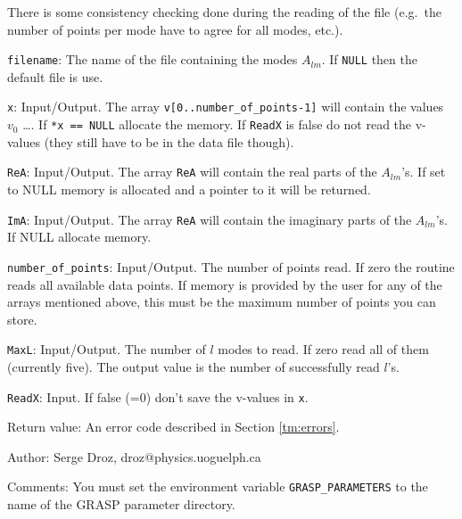 There is some consistency checking done during the reading of the file
(e.g.~the number of points per mode have to agree for all modes, etc.).
\begin{description}
\item{{\tt filename}}: The name of the file containing the modes $A_{lm}$. 
              If {\tt NULL} then the default file is use.
\item{{\tt x}}: Input/Output. The array 
              {\tt *v[0..number\_of\_points-1]} will contain the values 
			  $v_0$ \ldots. If {\tt **x == NULL} allocate the memory.
			  If {\tt ReadX} is false do not read the v-values (they still have
			  to be in the data file though).
\item{{\tt ReA}}: Input/Output. The array 
              {\tt *ReA} will contain the real parts
			  of the $A_{lm}$'s. If set to NULL memory is allocated and a pointer
			  to it will be returned. 
\item{{\tt ImA}}: Input/Output. The array 
              {\tt *ReA} will contain the imaginary parts
			  of the $A_{lm}$'s. If NULL allocate memory.  
\item{{\tt number\_of\_points}}: Input/Output. The number of points read. If zero the routine
reads all
available data points. If memory is provided by the user for any of the arrays
mentioned above, 
this must be the maximum number of points you can store.
\item{{\tt MaxL}}:  Input/Output. The number of $l$ modes to read. 
If zero read all of them (currently five). The output value is the number of
successfully read $l$'s.
\item{{\tt ReadX}}: Input. If false (=0) don't save the v-values in 
{\tt *x}.
\item{Return value}: An error code described in Section \ref{tm:errors}.
\end{description}
\begin{description}
\item{Author:} Serge Droz, droz@physics.uoguelph.ca
\item{Comments:} You must set the environment variable 
                 {\tt GRASP\_PARAMETERS} to the name of the 
				 GRASP parameter directory.
\end{description}
\clearpage
%
%

